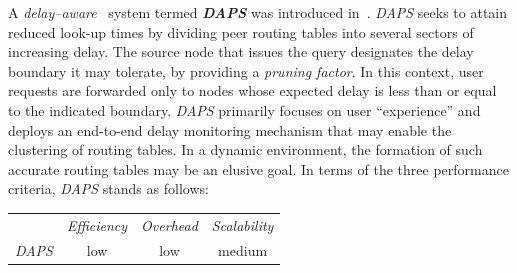 A \emph{delay--aware} \p\ system termed \textbf{\emph{DAPS}} 
was introduced in~\cite{ZL2005}.
\emph{DAPS}  seeks to attain reduced look-up times by dividing 
peer routing tables into several sectors of increasing delay. 
The source node that issues the query designates the delay 
boundary it may tolerate, by providing a \emph{pruning factor}.
In this context, user requests are forwarded only to 
nodes whose expected delay is less than or equal to the indicated boundary. 
\emph{DAPS} primarily focuses on user ``experience'' and deploys an
end-to-end delay monitoring mechanism that may enable
the clustering of routing tables. 
In a dynamic environment, the formation of such 
accurate routing tables may be an elusive goal.
In terms of the three performance criteria, \emph{DAPS} stands as follows:
\begin{center}
{\footnotesize
\begin{tabular}{rccc}
\multicolumn{1}{r}{} &
\multicolumn{1}{c}{\emph{Efficiency}} &
\multicolumn{1}{c}{\emph{Overhead}} &
\multicolumn{1}{c}{\emph{Scalability}}
\\
\cline{2-4}
\emph{DAPS} &
low &
low &
%
medium
\end{tabular}
}
\end{center}


